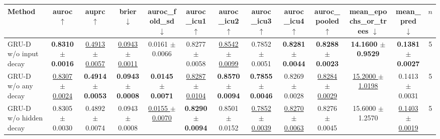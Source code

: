 \begin{tabular}{lcccccccccccc}
\toprule
Method & auroc $\uparrow$ & auprc $\uparrow$ & brier $\downarrow$ & auroc\_fold\_sd $\downarrow$ & auroc\_icu1 $\uparrow$ & auroc\_icu2 $\uparrow$ & auroc\_icu3 $\uparrow$ & auroc\_icu4 $\uparrow$ & auroc\_pooled $\uparrow$ & mean\_epochs\_or\_trees $\downarrow$ & mean\_pred $\downarrow$ & $n$ \\
\midrule
GRU-D w/o input decay & \textbf{0.8310 $\pm$ 0.0016} & \underline{0.4913 $\pm$ 0.0057} & \underline{0.0943 $\pm$ 0.0011} & 0.0161 $\pm$ 0.0066 & 0.8277 $\pm$ 0.0058 & \underline{0.8542 $\pm$ 0.0099} & 0.7852 $\pm$ 0.0051 & \textbf{0.8281 $\pm$ 0.0044} & \textbf{0.8288 $\pm$ 0.0023} & \textbf{14.1600 $\pm$ 0.9529} & \textbf{0.1381 $\pm$ 0.0027} & 5 \\
GRU-D w/o any decay & \underline{0.8307 $\pm$ 0.0024} & \textbf{0.4914 $\pm$ 0.0053} & \textbf{0.0943 $\pm$ 0.0008} & \textbf{0.0145 $\pm$ 0.0071} & \underline{0.8287 $\pm$ 0.0104} & \textbf{0.8570 $\pm$ 0.0094} & \textbf{0.7855 $\pm$ 0.0046} & 0.8269 $\pm$ 0.0028 & \underline{0.8284 $\pm$ 0.0029} & \underline{15.2000 $\pm$ 1.0198} & 0.1413 $\pm$ 0.0031 & 5 \\
GRU-D w/o hidden decay & 0.8305 $\pm$ 0.0030 & 0.4892 $\pm$ 0.0074 & 0.0943 $\pm$ 0.0008 & \underline{0.0155 $\pm$ 0.0070} & \textbf{0.8290 $\pm$ 0.0094} & 0.8501 $\pm$ 0.0152 & \underline{0.7852 $\pm$ 0.0039} & \underline{0.8270 $\pm$ 0.0063} & 0.8276 $\pm$ 0.0045 & 15.6000 $\pm$ 1.2570 & \underline{0.1403 $\pm$ 0.0019} & 5 \\
\bottomrule
\end{tabular}
